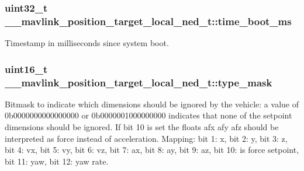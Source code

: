 \hypertarget{struct____mavlink__position__target__local__ned__t_af7e31d253c6e972d1e712196e40310af}{
\subsubsection[{time\+\_\+boot\+\_\+ms}]{\setlength{\rightskip}{0pt plus 5cm}uint32\+\_\+t \+\_\+\+\_\+mavlink\+\_\+position\+\_\+target\+\_\+local\+\_\+ned\+\_\+t\+::time\+\_\+boot\+\_\+ms}}\label{struct____mavlink__position__target__local__ned__t_af7e31d253c6e972d1e712196e40310af}


Timestamp in milliseconds since system boot. 

\hypertarget{struct____mavlink__position__target__local__ned__t_a4210ddad325334f8c92e2c8a09415467}{
\subsubsection[{type\+\_\+mask}]{\setlength{\rightskip}{0pt plus 5cm}uint16\+\_\+t \+\_\+\+\_\+mavlink\+\_\+position\+\_\+target\+\_\+local\+\_\+ned\+\_\+t\+::type\+\_\+mask}}\label{struct____mavlink__position__target__local__ned__t_a4210ddad325334f8c92e2c8a09415467}


Bitmask to indicate which dimensions should be ignored by the vehicle\+: a value of 0b0000000000000000 or 0b0000001000000000 indicates that none of the setpoint dimensions should be ignored. If bit 10 is set the floats afx afy afz should be interpreted as force instead of acceleration. Mapping\+: bit 1\+: x, bit 2\+: y, bit 3\+: z, bit 4\+: vx, bit 5\+: vy, bit 6\+: vz, bit 7\+: ax, bit 8\+: ay, bit 9\+: az, bit 10\+: is force setpoint, bit 11\+: yaw, bit 12\+: yaw rate. 

